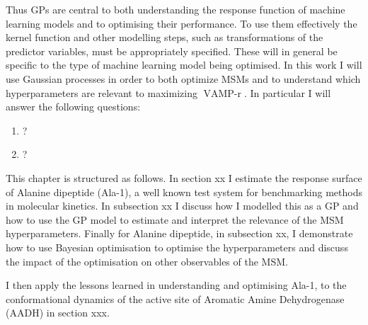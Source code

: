 Thus GPs are central to both understanding the response function of machine learning models and to optimising their performance. To use them effectively the kernel function and other modelling steps, such as transformations of the predictor variables, must be appropriately specified. These will in general be specific to the type of machine learning model being optimised.  In this work  I will use Gaussian processes in order to both optimize MSMs and to understand which hyperparameters are relevant to maximizing $\operatorname{VAMP-r}$.  In particular I will answer the following questions: 

\begin{enumerate}
    \item ?
    \item ?
\end{enumerate}

This chapter is structured as follows. In section xx I estimate the response surface of Alanine dipeptide (Ala-1), a well known test system for benchmarking methods in molecular kinetics. In subsection xx I discuss how I modelled this as a GP and how to use the GP model to estimate and interpret the relevance of the MSM hyperparameters. Finally for Alanine dipeptide, in subsection xx, I demonstrate how to use Bayesian optimisation to optimise the hyperparameters and discuss the impact of the optimisation on other observables of the MSM. 

I then apply the lessons learned in understanding and optimising Ala-1, to the conformational dynamics of the active site of Aromatic Amine Dehydrogenase (AADH) in section xxx. 




